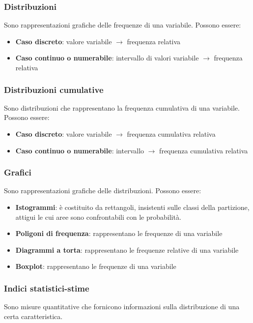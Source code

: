 \documentclass[a4paper]{article}
\theoremstyle{break}
\theoremstyle{break}
\theoremstyle{break}
\theoremstyle{break}
\begin{document}
\subsubsection{Distribuzioni}
Sono rappresentazioni grafiche delle frequenze di una variabile. Possono essere:
\begin{itemize}
	\item \textbf{Caso discreto}: valore variabile \( \to  \) frequenza relativa
	\item \textbf{Caso continuo o numerabile}: intervallo di valori variabile \( \to  \) frequenza relativa
\end{itemize}

\subsubsection{Distribuzioni cumulative}
Sono distribuzioni che rappresentano la frequenza cumulativa di una variabile. Possono essere:
\begin{itemize}
	\item \textbf{Caso discreto}: valore variabile \( \to  \) frequenza cumulativa relativa
	\item \textbf{Caso continuo o numerabile}: intervallo \( \to  \) frequenza cumulativa relativa
\end{itemize}

\subsubsection{Grafici}
Sono rappresentazioni grafiche delle distribuzioni. Possono essere:
\begin{itemize}
	\item \textbf{Istogrammi}: è costituito da rettangoli, insistenti sulle classi
	      della partizione, attigui le cui aree sono confrontabili con le probabilità.
	\item \textbf{Poligoni di frequenza}: rappresentano le frequenze di una variabile
	\item \textbf{Diagrammi a torta}: rappresentano le frequenze relative di una variabile
	\item \textbf{Boxplot}: rappresentano le frequenze di una variabile
\end{itemize}

\subsubsection{Indici statistici-stime}
Sono misure quantitative che fornicono informazioni sulla distribuzione di una certa
caratteristica.
\end{document}
